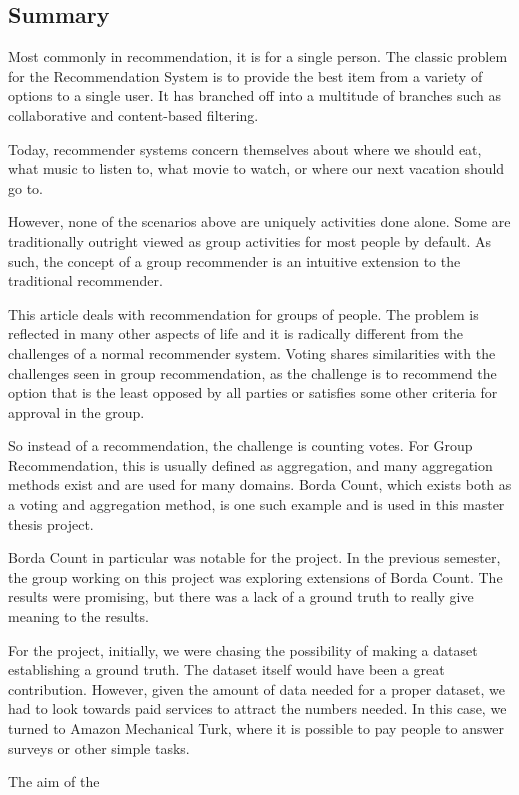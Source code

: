 \begin{titlepage}
\section*{Summary}
Most commonly in recommendation, it is for a single person. The classic problem for the Recommendation System is to provide the best item from a variety of options to a single user. It has branched off into a multitude of branches such as collaborative and content-based filtering.

Today, recommender systems concern themselves about where we should eat, what music to listen to, what movie to watch, or where our next vacation should go to.

However, none of the scenarios above are uniquely activities done alone. Some are traditionally outright viewed as group activities for most people by default. As such, the concept of a group recommender is an intuitive extension to the traditional recommender.

This article deals with recommendation for groups of people. The problem is reflected in many other aspects of life and it is radically different from the challenges of a normal recommender system. Voting shares similarities with the challenges seen in group recommendation, as the challenge is to recommend the option that is the least opposed by all parties or satisfies some other criteria for approval in the group.

So instead of a recommendation, the challenge is counting votes. For Group Recommendation, this is usually defined as aggregation, and many aggregation methods exist and are used for many domains. Borda Count, which exists both as a voting and aggregation method, is one such example and is used in this master thesis project.

Borda Count in particular was notable for the project. In the previous semester, the group working on this project was exploring extensions of Borda Count. The results were promising, but there was a lack of a ground truth to really give meaning to the results.

For the project, initially, we were chasing the possibility of making a dataset establishing a ground truth. The dataset itself would have been a great contribution. However, given the amount of data needed for a proper dataset, we had to look towards paid services to attract the numbers needed. In this case, we turned to Amazon Mechanical Turk, where it is possible to pay people to answer surveys or other simple tasks.

The aim of the
\end{titlepage}
